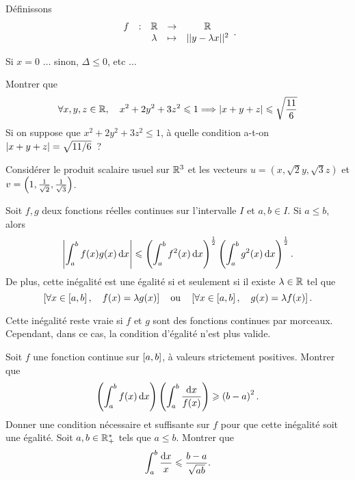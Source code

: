 \documentclass{magnolia}
\begin{document}
\begin{preuve}
Définissons $$\begin{array}{ccccc}
f & : & \R & \to & \R \\
 & & \lambda & \mapsto & ||y-\lambda x||^2 
\end{array}.$$

Si $x=0$ $\ldots$ sinon, $\Delta\le 0$, etc $\ldots$
\end{preuve}

\begin{exoUnique}
\exo Montrer que
  \[\forall x,y,z\in\R \qsep x^2+2y^2+3z^2\leq 1 \implique
    \abs{x+y+z}\leq\sqrt{\frac{11}{6}}\]
  Si on suppose que $x^2+2y^2+3z^2\leq 1$, à quelle condition a-t-on
  $\abs{x+y+z}=\sqrt{11/6}$~?
  \begin{sol}
  Considérer le produit scalaire usuel sur $\R^3$ et les vecteurs
  $u=(x,\sqrt{2}y,\sqrt{3}z)$ et $v=\p{1,\frac{1}{\sqrt{2}},\frac{1}{\sqrt{3}}}$.
  \end{sol}
\end{exoUnique}

\begin{proposition}[utile=3, nom=Inégalité de \nom{Cauchy-Schwarz}]
Soit $f,g$ deux fonctions réelles continues sur l'intervalle $I$
et $a,b\in I$. Si $a\leq b$, alors
\[\abs{\integ{a}{b}{f(x)g(x)}{x}}\leq
  \p{\integ{a}{b}{f^2(x)}{x}}^{\frac{1}{2}}
  \p{\integ{a}{b}{g^2(x)}{x}}^{\frac{1}{2}}.\]
De plus, cette inégalité est une égalité si et seulement si il existe
$\lambda\in\R$ tel que
\[\cro{\forall x\in\interf{a}{b} \qsep f(x)=\lambda g(x)}
  \quad\text{ou}\quad
  \cro{\forall x\in\interf{a}{b} \qsep g(x)=\lambda f(x)}.\]
\end{proposition}

\begin{remarqueUnique}
\remarque Cette inégalité reste vraie si $f$ et $g$ sont des fonctions continues
  par morceaux. Cependant, dans ce cas, la condition d'égalité n'est plus valide.
\end{remarqueUnique}

\begin{exos}
\exo Soit $f$ une fonction continue sur $\interf{a}{b}$,
  à valeurs strictement positives. Montrer que
  \[\p{\integ{a}{b}{f(x)}{x}}\p{\integinv{a}{b}{f(x)}{x}}\geq\p{b-a}^2.\]
  Donner une condition nécessaire et suffisante sur $f$ pour que cette inégalité
  soit une égalité.
\exo Soit $a,b\in\RPs$ tels que $a\leq b$. Montrer que
  \[\integinv{a}{b}{x}{x}\leq \frac{b-a}{\sqrt{ab}}.\]
\end{exos}
\end{document}
